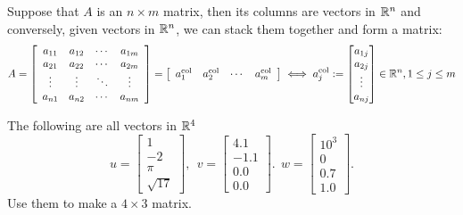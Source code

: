 \begin{tcolorbox}[sharp corners, colback=green!30, colframe=green!80!blue,
title=\textbf{\Large Columns of Matrices are Vectors and Vice Versa}]
Suppose that $A$ is an $n\times m$ matrix, then its columns are vectors in $\mathbb R^n$ and conversely, given vectors in $\mathbb R^n$, we can stack them together and form a matrix:
\begin{equation}
\label{eq:ColumnsOfMatrixVectorsRn}
    A =  \left[\begin{array}{cccc} a_{11}& a_{12}& \cdots & a_{1m} \\
 a_{21}& a_{22}& \cdots & a_{2m}  \\
 \vdots & \vdots&  \ddots & \vdots \\
 a_{n1}& a_{n2}& \cdots & a_{nm} 
 \end{array}\right] =
\left[\begin{array}{cccc} a_1^{\rm col} & a_2^{\rm col} & \cdots & a_m^{\rm col}\end{array}\right]  \iff a_j^{\rm col}:=\begin{bmatrix} a_{1j} \\ a_{2j}  \\ \vdots \\ a_{nj} \end{bmatrix} \in \mathbb R^n, 1 \le j \le m
\end{equation}
\end{tcolorbox}

\vspace*{0.5cm}
\begin{example}
\label{ex:VectorR4ToMatrix}
The following are all vectors in $\mathbb R^4$
$$
u=\left[\begin{array}{r} 1 \\-2 \\ \pi \\ \sqrt{17}\end{array}\right],~~v= \left[\begin{array}{r} 4.1 \\-1.1 \\ 0.0 \\ 0.0\end{array}\right].~~w=\left[\begin{array}{r} 10^3 \\0 \\ 0.7 \\ 1.0\end{array}\right].
$$
Use them to make a $4 \times 3$ matrix.

\end{example}

